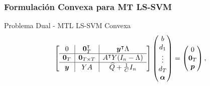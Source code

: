 \documentclass{beamer}
\newcommand{\upper}[1]{\expandafter\MakeUppercase\expandafter{#1}}
\newcommand{\mymat}[1]{\upper{#1}}
\newcommand{\myvec}[1]{\bm{#1}}
\newcommand{\fv}[1]{\myvec{#1}}
\newcommand{\fm}[1]{\mymat{#1}}
\newcommand{\nsamples}{n}
\newcommand{\ntasks}{T}
\begin{document}
\begin{frame}
      \frametitle{Formulación Convexa para MT LS-SVM}
  
      \begin{block}{Problema Dual - MTL LS-SVM Convexa}
            \begin{equation}
                  \nonumber
                  \begin{aligned}
                  \left[
                  \begin{array}{c|c|c}
                  0 & \fv{0}_\ntasks^\intercal &  \fv{y}^\intercal \Lambda \\
                  \hline
                  \fv{0}_\ntasks & \fv{0}_{\ntasks \times \ntasks} & \fm{A}^\intercal \fm{y} (I_\nsamples - \Lambda)\\
                  \hline
                  \fv{y} & \fm{y} \fm{A} & \widehat{\fm{Q}} + \frac{1}{C} \fm{I}_\nsamples
                  \end{array}
                  \right] 
                  \begin{pmatrix}
                      b \\
                      d_1 \\
                      \vdots \\
                      d_\ntasks \\
                      \fv{\alpha}
                  \end{pmatrix}
                  = 
                  \begin{pmatrix}
                      0 \\
                      \fv{0}_\ntasks \\
                      \fv{p}
                  \end{pmatrix}, 
                  \end{aligned}
              \end{equation}
      \end{block}

  \end{frame}
\end{document}
